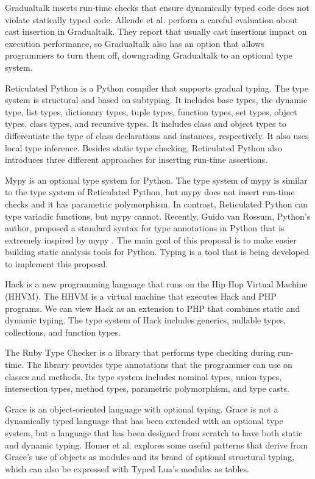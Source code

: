 Gradualtalk inserts run-time checks that ensure dynamically
typed code does not violate statically typed code.
Allende et al. \cite{allende2013cis} perform a careful
evaluation about cast insertion in Gradualtalk.
They report that usually cast insertions impact on execution
performance, so Gradualtalk also has an option that allows
programmers to turn them off, downgrading Gradualtalk
to an optional type system.

Reticulated Python \cite{vitousek2014deg} is a Python compiler
that supports gradual typing.
The type system is structural and based on subtyping.
It includes base types, the dynamic type, list types,
dictionary types, tuple types, function types, set types,
object types, class types, and recursive types.
It includes class and object types to differentiate the
type of class declarations and instances, respectively.
It also uses local type inference.
Besides static type checking, Reticulated Python also introduces
three different approaches for inserting run-time assertions.

Mypy \cite{mypy} is an optional type system for Python.
The type system of mypy is similar to the type system of
Reticulated Python, but mypy does not insert run-time checks
and it has parametric polymorphism.
In contrast, Reticulated Python can type variadic functions,
but mypy cannot.
Recently, Guido van Rossum, Python's author, proposed a
standard syntax for type annotations in Python \cite{PEP483}
that is extremely inspired by mypy \cite{PEP484}.
The main goal of this proposal is to make easier building
static analysis tools for Python.
Typing \cite{typing} is a tool that is being developed to
implement this proposal.

Hack \cite{hack} is a new programming language that runs on the
Hip Hop Virtual Machine (HHVM).
The HHVM is a virtual machine that executes Hack and PHP programs.
We can view Hack as an extension to PHP that combines static and
dynamic typing.
The type system of Hack includes generics, nullable types, collections,
and function types.

The Ruby Type Checker \cite{ren2013rtc} is a library that
performs type checking during run-time.
The library provides type annotations that the programmer
can use on classes and methods.
Its type system includes nominal types, union types,
intersection types, method types, parametric polymorphism,
and type casts.

Grace \cite{black2013sg} is an object-oriented language
with optional typing.
Grace is not a dynamically typed language that has been
extended with an optional type system, but a language
that has been designed from scratch to have both
static and dynamic typing.
Homer et al. \cite{homer2013modules} explores some
useful patterns that derive from Grace's use of objects as modules
and its brand of optional structural typing, which
can also be expressed with Typed Lua's modules as tables.
